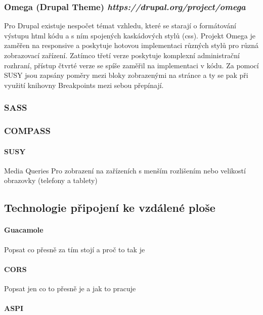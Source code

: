 \subsubsection*{Omega (Drupal Theme) \hfill \emph{https://drupal.org/project/omega}}

Pro Drupal existuje nespočet témat vzhledu, které se starají o formátování výstupu html kódu a s ním spojených kaskádových stylů (css). Projekt Omega je zaměřen na \gls{responsive} a poskytuje hotovou implementaci různých stylů pro různá zobrazovací zařízení. Zatímco třetí verze poskytuje komplexní administrační rozhraní, přístup čtvrté verze se spíše zaměřil na implementaci v kódu. Za pomocí SUSY jsou zapsány poměry mezi bloky zobrazenými na stránce a ty se pak při využití knihovny Breakpoints\cite{website:breakpoints} mezi sebou přepínají.

\subsubsection*{SASS}

\subsubsection*{COMPASS}

\paragraph*{SUSY}

Media Queries
Pro zobrazení na zařízeních s menším rozlišením nebo velikostí obrazovky (telefony a tablety)
	

\subsection{Technologie připojení ke vzdálené ploše}

\paragraph*{Guacamole}
Popsat co přesně za tím stojí a proč to tak je

\paragraph*{CORS} 

Popsat jen co to přesně je a jak to pracuje

\paragraph*{ASPI}


